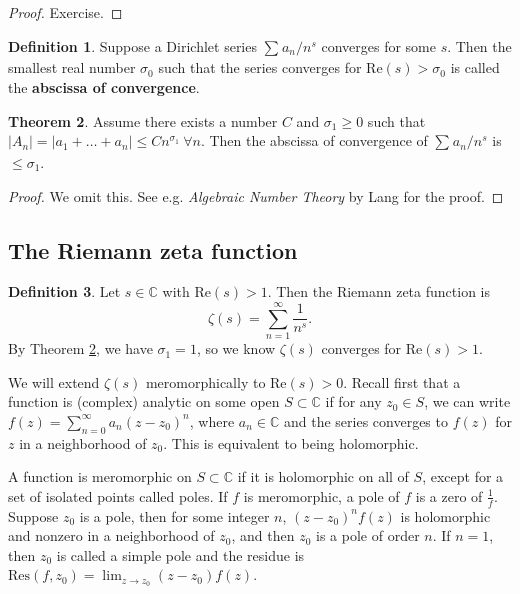 \documentclass{article}
\theoremstyle{definition}
\newtheorem{theorem}{Theorem}[section]
\newtheorem{defn}[theorem]{Definition}
\begin{document}
\begin{proof}
    Exercise.
\end{proof}
\begin{defn}\label{defn2.5}
    Suppose a Dirichlet series $\sum_{}^{} a_n/n^s$ converges for some $s$. Then the smallest real number $\sigma_0$ such that the series converges for $\text{Re}(s)>\sigma_0$ is called the \textbf{abscissa of convergence}.
\end{defn}
\begin{theorem}\label{theorem2.6}
    Assume there exists a number $C$ and $\sigma_1\ge 0$ such that $\left|A_n\right|=\left|a_1+\ldots+a_n\right|\le Cn^{\sigma_1} ~\forall n$. Then the abscissa of convergence of $\sum_{}^{} a_n/n^s$ is $\le \sigma_1$.
\end{theorem}
\begin{proof}
    We omit this. See e.g. \textit{Algebraic Number Theory} by Lang for the proof.
\end{proof}
\subsection{The Riemann zeta function}
\begin{defn}\label{defn2.7}
    Let $s \in \mathbb{C}$ with $\text{Re}(s)>1$. Then the Riemann zeta function is \[
    \zeta(s) = \sum_{n=1}^{\infty} \frac{1}{n^s}.
    \]
    By Theorem \ref{theorem2.6}, we have $\sigma_1=1$, so we know $\zeta(s)$ converges for $\text{Re}(s)>1$.
\end{defn}
We will extend $\zeta(s)$ meromorphically to $\text{Re}(s)>0$. Recall first that a function is (complex) analytic on some open $S \subset \mathbb{C}$ if for any $z_0 \in S$, we can write $f(z) = \sum_{n=0}^{\infty} a_n(z-z_0)^n$, where $a_n \in \mathbb{C}$ and the series converges to $f(z)$ for $z$ in a neighborhood of $z_0$. This is equivalent to being holomorphic.
\vspace{1mm}
 
A function is meromorphic on $S \subset \mathbb{C}$ if it is holomorphic on all of $S$, except for a set of isolated points called poles. If $f$ is meromorphic, a pole of $f$ is a zero of $\frac{1}{f}$. Suppose $z_0$ is a pole, then for some integer $n$, $(z-z_0)^nf(z)$ is holomorphic and nonzero in a neighborhood of $z_0$, and then $z_0$ is a pole of order $n$. If $n=1$, then $z_0$ is called a simple pole and the residue is $\text{Res}(f,z_0) = \lim_{z \to z_0}(z-z_0)f(z)$.

\vspace{1mm}
 
\end{document}
